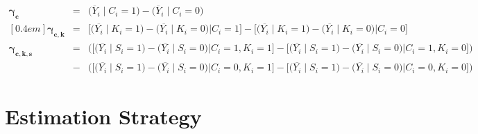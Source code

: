 \documentclass[11pt]{article}
\begin{document}
\begin{eqnarray*}  
\boldsymbol{\gamma_c} & = &  \Big(\overline{Y}_i \mid C_i = 1\Big) - \Big(\overline{Y}_i \mid C_i = 0\Big) \\ [0.4em]
\boldsymbol{\gamma_{c,k}} & = & \Bigg[\Big(\overline{Y_i} \mid K_i = 1\Big) - \Big(\overline{Y_i} \mid K_i = 0\Big) \Big| C_i =1 \Bigg] - \Bigg[\Big(\overline{Y_i} \mid K_i = 1) - \Big(\overline{Y_i} \mid K_i = 0\Big) \Big| C_i = 0 \Bigg] \\[0.6em]
\boldsymbol{\gamma_{c,k,s}} & = & \Bigg(\Big[\Big(\overline{Y_i} \mid S_i = 1\Big) - \Big(\overline{Y_i} \mid S_i = 0\Big)\Big| C_i =1, K_i = 1 \Big] - \Big[\Big(\overline{Y_i} \mid S_i = 1\Big) - \Big(\overline{Y_i} \mid S_i = 0\Big)\Big| C_i =1, K_i = 0 \Big]\Bigg) \\
&  - & \Bigg(\Big[\Big(\overline{Y_i} \mid S_i = 1\Big) - \Big(\overline{Y_i} \mid S_i = 0\Big)\Big| C_i =0, K_i = 1 \Big] - \Big[\Big(\overline{Y_i} \mid S_i = 1\Big) - \Big(\overline{Y_i} \mid S_i = 0\Big)\Big| C_i =0, K_i = 0 \Big]\Bigg)
\end{eqnarray*}


\section{Estimation Strategy}
\end{document}
